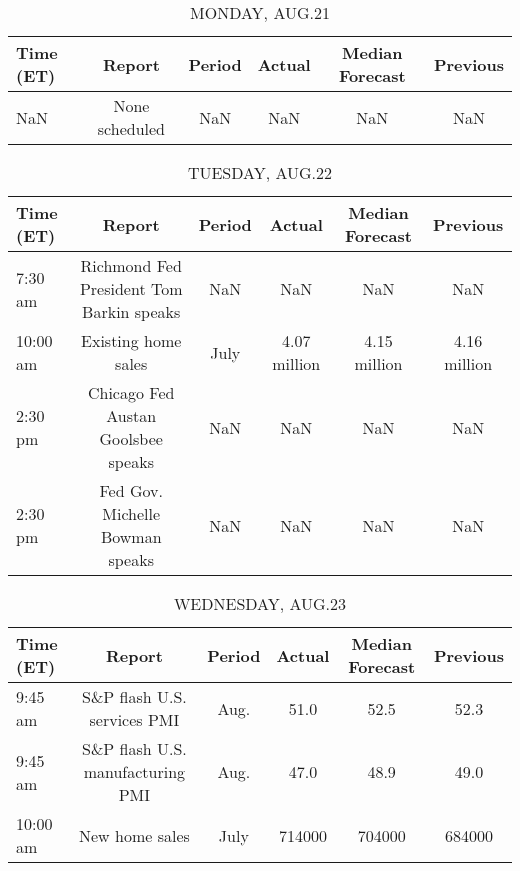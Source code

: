 \documentclass{article}%
\begin{document}
%
\normalsize%


\begin{table}[htbp]%
\caption{MONDAY, AUG.21}%
\centering%
\begin{adjustbox}{width=1\textwidth}%
\begin{tabular}{lccccc}
\toprule
Time (ET) &         Report & Period & Actual & Median Forecast & Previous \\
\midrule
      NaN & None scheduled &    NaN &    NaN &             NaN &      NaN \\
\bottomrule
\end{tabular}
%
\end{adjustbox}%
\end{table}

%


\begin{table}[htbp]%
\caption{TUESDAY, AUG.22}%
\centering%
\begin{adjustbox}{width=1\textwidth}%
\begin{tabular}{lccccc}
\toprule
Time (ET) &                                   Report & Period &       Actual & Median Forecast &     Previous \\
\midrule
  7:30 am & Richmond Fed President Tom Barkin speaks &    NaN &          NaN &             NaN &          NaN \\
 10:00 am &                      Existing home sales &   July & 4.07 million &    4.15 million & 4.16 million \\
  2:30 pm &       Chicago Fed Austan Goolsbee speaks &    NaN &          NaN &             NaN &          NaN \\
  2:30 pm &          Fed Gov. Michelle Bowman speaks &    NaN &          NaN &             NaN &          NaN \\
\bottomrule
\end{tabular}
%
\end{adjustbox}%
\end{table}

%


\begin{table}[htbp]%
\caption{WEDNESDAY, AUG.23}%
\centering%
\begin{adjustbox}{width=1\textwidth}%
\begin{tabular}{lccccc}
\toprule
Time (ET) &                           Report & Period & Actual & Median Forecast & Previous \\
\midrule
  9:45 am &      S\&P flash U.S. services PMI &   Aug. &   51.0 &            52.5 &     52.3 \\
  9:45 am & S\&P flash U.S. manufacturing PMI &   Aug. &   47.0 &            48.9 &     49.0 \\
 10:00 am &                   New home sales &   July & 714000 &          704000 &   684000 \\
\bottomrule
\end{tabular}
%
\end{adjustbox}%
\end{table}
\end{document}
